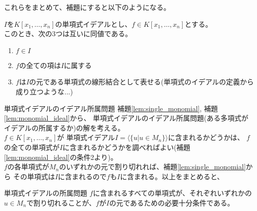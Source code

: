 \begin{frame}
	これらをまとめて、補題にすると以下のようになる。
	\begin{lemma}
		\label{lem:monomial_ideal}
		$I$を$K[x_1, \ldots, x_n]$の単項式イデアルとし、$f \in K[x_1, \ldots, x_n]$とする。\\
		このとき、次の3つは互いに同値である。\\
		\begin{enumerate}
			\item $f \in I$
			\item $f$の全ての項は$I$に属する
			\item $f$は$I$の元である単項式の線形結合として表せる(単項式のイデアルの定義から成り立つような...)
		\end{enumerate}
	\end{lemma}
\end{frame}

\begin{frame} {単項式イデアルのイデアル所属問題}
	補題\ref{lem:single_monomial}, 補題\ref{lem:monomial_ideal}から、
	単項式イデアルのイデアル所属問題(ある多項式がイデアルの所属するか)の解を考える。\\
	$f \in K[x_1, \ldots, x_n]$が
	単項式イデアル$I = \langle \{ u |u \in M_n \} \rangle$に含まれるかどうかは、
	$f$の全ての単項式が$I$に含まれるかどうかを調べればよい(補題\ref{lem:monomial_ideal}の条件2より)。\\
	$f$の各単項式が$M_n$のいずれかの元で割り切れれば、補題\ref{lem:single_monomial}から
	その単項式は$I$に含まれるので$f$も$I$に含まれる。以上をまとめると、\\
	\begin{block} {単項式イデアルの所属問題}
		$f$に含まれるすべての単項式が、それぞれいずれかの$u \in M_n$で割り切れることが、$f$が$I$の元であるための必要十分条件である。
	\end{block}
\end{frame}


